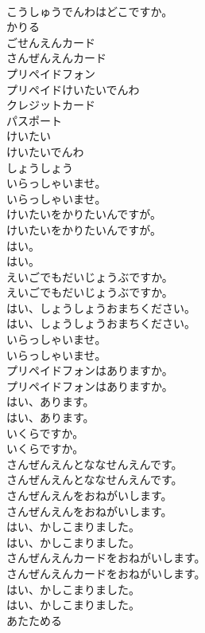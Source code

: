 \documentclass[8pt]{extreport}
\begin{document}
\begin{CJK}{UTF8}{min}
\\	こうしゅうでんわはどこですか。 
\\	かりる
\\	ごせんえんカード
\\	さんぜんえんカード
\\	プリペイドフォン
\\	プリペイドけいたいでんわ
\\	クレジットカード
\\	パスポート
\\	けいたい
\\	けいたいでんわ
\\	しょうしょう
\\	いらっしゃいませ。	
\\	いらっしゃいませ。 
\\	けいたいをかりたいんですが。	
\\	けいたいをかりたいんですが。 
\\	はい。	
\\	はい。 
\\	えいごでもだいじょうぶですか。	
\\	えいごでもだいじょうぶですか。 
\\	はい、しょうしょうおまちください。	
\\	はい、しょうしょうおまちください。 
\\	いらっしゃいませ。	
\\	いらっしゃいませ。 
\\	プリペイドフォンはありますか。	
\\	プリペイドフォンはありますか。 
\\	はい、あります。	
\\	はい、あります。 
\\	いくらですか。	
\\	いくらですか。 
\\	さんぜんえんとななせんえんです。	
\\	さんぜんえんとななせんえんです。 
\\	さんぜんえんをおねがいします。	
\\	さんぜんえんをおねがいします。 
\\	はい、かしこまりました。	
\\	はい、かしこまりました。 
\\	さんぜんえんカードをおねがいします。	
\\	さんぜんえんカードをおねがいします。 
\\	はい、かしこまりました。	
\\	はい、かしこまりました。 
\\	あたためる

\end{CJK}
\end{document}
